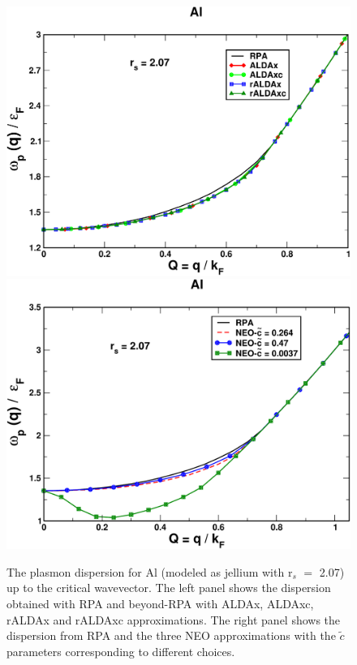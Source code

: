 \documentclass[aps,amsmath,amssymb, preprint, 12pt]{revtex4-1}
\begin{document}


\begin{figure}[h!]	
	\includegraphics[scale=0.3]{figure_1.pdf}
	\includegraphics[scale=0.3]{figure_2.pdf}
	\caption{The plasmon dispersion for Al (modeled as jellium with r$_s$ $=$ 2.07) up to the critical wavevector. The left panel shows the dispersion obtained with RPA and beyond-RPA with ALDAx, ALDAxc, rALDAx and rALDAxc approximations. The right panel shows the dispersion from RPA and the three NEO approximations with the  \( \widetilde{c} \)  parameters corresponding to different choices.}
	\label{fig1}
\end{figure}
\end{document}
